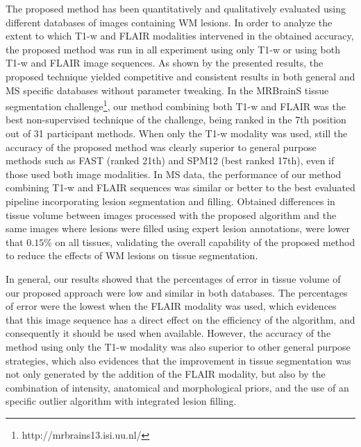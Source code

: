 The proposed method has been quantitatively and qualitatively evaluated using different databases of images containing WM lesions. In order to analyze the extent to which T1-w and FLAIR modalities intervened in the obtained accuracy, the proposed method was run in all experiment using only T1-w or using both T1-w and FLAIR image sequences. As shown by the presented results, the proposed technique yielded competitive and consistent results in both general and MS specific databases without parameter tweaking. In the MRBrainS tissue segmentation challenge\footnote{http://mrbrains13.isi.uu.nl/}, our method combining both T1-w and FLAIR was the best non-supervised technique of the challenge, being ranked in the 7th position out of 31 participant methods. When only the T1-w modality was used, still the accuracy of the proposed method was clearly superior to general purpose methods such as FAST (ranked 21th) and SPM12 (best ranked 17th), even if those used both image modalities. In MS data, the performance of our method combining T1-w and FLAIR sequences was similar or better to the best evaluated pipeline incorporating lesion segmentation and filling. Obtained differences in tissue volume between images processed with the proposed algorithm and the same images where lesions were filled using expert lesion annotations, were lower that $0.15\%$ on all tissues, validating the overall capability of the proposed method to reduce the effects of WM lesions on tissue segmentation. 

In general, our results showed that the percentages of error in tissue volume of our proposed approach were low and similar in both databases. The percentages of error were the lowest when the FLAIR modality was used, which evidences that this image sequence has a direct effect on the efficiency of the algorithm, and consequently it should be used when available. However, the accuracy of the method using only the T1-w modality was also superior to other general purpose strategies, which also evidences that the improvement in tissue segmentation was not only generated by the addition of the FLAIR modality, but also by the combination of intensity, anatomical and morphological priors, and the use of an specific outlier algorithm with integrated lesion filling.


